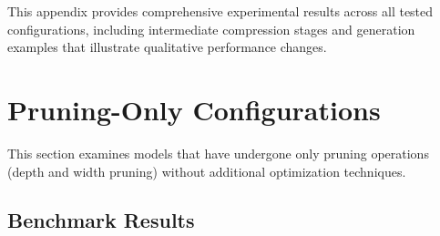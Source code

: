 This appendix provides comprehensive experimental results across all tested configurations, including intermediate compression stages and generation examples that illustrate qualitative performance changes.

\section{Pruning-Only Configurations} \label{app:appendix1_pruning}

This section examines models that have undergone only pruning operations (depth and width pruning) without additional optimization techniques.

\subsection{Benchmark Results}

